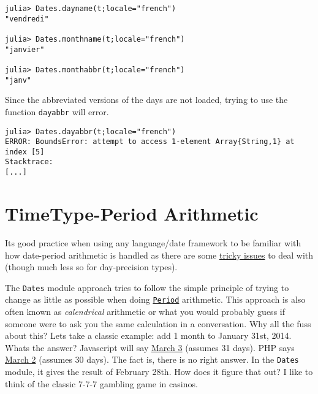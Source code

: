 \begin{verbatim}
julia> Dates.dayname(t;locale="french")
"vendredi"

julia> Dates.monthname(t;locale="french")
"janvier"

julia> Dates.monthabbr(t;locale="french")
"janv"
\end{verbatim}



Since the abbreviated versions of the days are not loaded, trying to use the function \texttt{dayabbr} will error.




\begin{verbatim}
julia> Dates.dayabbr(t;locale="french")
ERROR: BoundsError: attempt to access 1-element Array{String,1} at index [5]
Stacktrace:
[...]
\end{verbatim}



\hypertarget{10010400361329749456}{}


\section{TimeType-Period Arithmetic}



It{\textquotesingle}s good practice when using any language/date framework to be familiar with how date-period arithmetic is handled as there are some \href{https://codeblog.jonskeet.uk/2010/12/01/the-joys-of-date-time-arithmetic/}{tricky issues} to deal with (though much less so for day-precision types).



The \texttt{Dates} module approach tries to follow the simple principle of trying to change as little as possible when doing \hyperlink{17624028548543163266}{\texttt{Period}} arithmetic. This approach is also often known as \emph{calendrical} arithmetic or what you would probably guess if someone were to ask you the same calculation in a conversation. Why all the fuss about this? Let{\textquotesingle}s take a classic example: add 1 month to January 31st, 2014. What{\textquotesingle}s the answer? Javascript will say \href{https://markhneedham.com/blog/2009/01/07/javascript-add-a-month-to-a-date/}{March 3} (assumes 31 days). PHP says \href{https://stackoverflow.com/questions/5760262/php-adding-months-to-a-date-while-not-exceeding-the-last-day-of-the-month}{March 2} (assumes 30 days). The fact is, there is no right answer. In the \texttt{Dates} module, it gives the result of February 28th. How does it figure that out? I like to think of the classic 7-7-7 gambling game in casinos.



